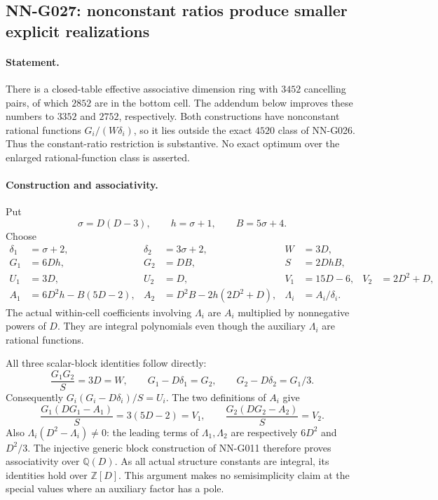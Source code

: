 \subsection{NN-G027: nonconstant ratios produce smaller explicit realizations}
\paragraph{Statement.}
There is a closed-table effective associative dimension ring
with $3452$ cancelling pairs, of which $2852$ are in the
bottom cell. The addendum below improves these numbers to
$3352$ and $2752$, respectively. Both constructions have
nonconstant rational functions
$G_i/(W\delta_i)$, so it lies outside the exact $4520$
class of NN-G026. Thus the constant-ratio restriction is
substantive. No exact optimum over the enlarged rational-function
class is asserted.

\paragraph{Construction and associativity.}
Put
\[
 \sigma=D(D-3),\qquad h=\sigma+1,\qquad B=5\sigma+4.
\]
Choose
\[
 \begin{aligned}
 \delta_1&=\sigma+2,&\delta_2&=3\sigma+2,&W&=3D,\\
 G_1&=6Dh,&G_2&=DB,&S&=2DhB,\\
 U_1&=3D,&U_2&=D,&V_1&=15D-6,&V_2&=2D^2+D,\\
 A_1&=6D^2h-B(5D-2),&
 A_2&=D^2B-2h(2D^2+D),&
 \Lambda_i&=A_i/\delta_i.
 \end{aligned}                                                       \tag{G027.1}
\]
The actual within-cell coefficients involving $\Lambda_i$
are $A_i$ multiplied by nonnegative powers of $D$.
They are integral polynomials even though the auxiliary
$\Lambda_i$ are rational functions.

All three scalar-block identities follow directly:
\[
 \frac{G_1G_2}{S}=3D=W,\qquad
 G_1-D\delta_1=G_2,\qquad
 G_2-D\delta_2=G_1/3.
\]
Consequently $G_i(G_i-D\delta_i)/S=U_i$.
The two definitions of $A_i$ give
\[
 \frac{G_1(DG_1-A_1)}S=3(5D-2)=V_1,\qquad
 \frac{G_2(DG_2-A_2)}S=V_2.
\]
Also $\Lambda_i(D^2-\Lambda_i)\ne0$: the leading
terms of $\Lambda_1,\Lambda_2$ are respectively
$6D^2$ and $D^2/3$. The injective generic block
construction of NN-G011 therefore proves associativity
over $\mathbb Q(D)$. As all actual structure constants
are integral, its identities hold over $\mathbb Z[D]$.
This argument makes no semisimplicity claim at the
special values where an auxiliary factor has a pole.

